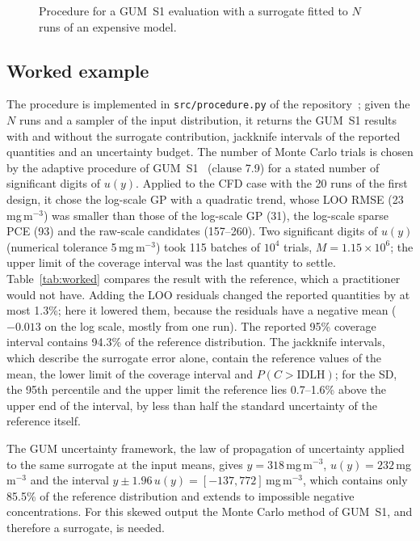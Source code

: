 \begin{figure}[tb]
\centering

\caption{Procedure for a GUM~S1 evaluation with a surrogate fitted to $N$
runs of an expensive model.}
\label{fig:flowchart}
\end{figure}

\subsection{Worked example}
\label{sec:worked}
The procedure is implemented in \texttt{src/procedure.py} of the
repository~\repocite; given the $N$ runs and a sampler of the input
distribution, it returns the GUM~S1 results with and without the surrogate
contribution, jackknife intervals of the reported quantities and an
uncertainty budget. The number of Monte Carlo trials is chosen by the
adaptive procedure of GUM~S1~\cite{jcgm101} (clause 7.9) for a stated number
of significant digits of $u(y)$. Applied to the CFD case with the 20 runs
of the first design, it chose the log-scale GP with a quadratic trend, whose LOO RMSE (23\,mg\,m$^{-3}$) was smaller than those of the
log-scale GP (31), the log-scale sparse PCE (93) and the raw-scale
candidates (157--260). Two significant digits of $u(y)$ (numerical
tolerance 5\,mg\,m$^{-3}$) took 115 batches of $10^4$ trials, $M=1.15\times10^6$;
the upper limit of the coverage interval was the last quantity to settle.
Table~\ref{tab:worked} compares the result with the reference, which a
practitioner would not have. Adding the LOO residuals changed the reported
quantities by at most 1.3\%; here it lowered them,
because the residuals have a negative mean ($-0.013$ on the log scale,
mostly from one run). The reported 95\% coverage interval contains
94.3\% of the reference distribution. The jackknife intervals, which
describe the surrogate error alone, contain the reference values of the
mean, the lower limit of the coverage interval and $P(C>\mathrm{IDLH})$;
for the SD, the 95th percentile and the upper limit the reference lies
0.7--1.6\% above the upper end of the interval, by less than half the
standard uncertainty of the reference itself.

The GUM uncertainty framework, the law of propagation of uncertainty applied
to the same surrogate at the input means, gives $y=318$\,mg\,m$^{-3}$,
$u(y)=232$\,mg\,m$^{-3}$ and the interval $y\pm1.96\,u(y)=[-137,772]$\,mg\,m$^{-3}$,
which contains only 85.5\% of the reference distribution and extends to
impossible negative concentrations. For this skewed output the Monte Carlo
method of GUM~S1, and therefore a surrogate, is needed.

